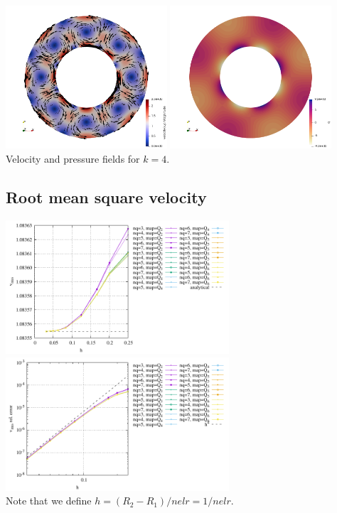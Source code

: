 \begin{center}
\includegraphics[width=6cm]{python_codes/fieldstone_152/images/vel}
\includegraphics[width=6cm]{python_codes/fieldstone_152/images/press}\\
{\captionfont Velocity and pressure fields for $k=4$.}
\end{center}

\subsection*{Root mean square velocity}

\begin{center}
\includegraphics[width=8.3cm]{python_codes/fieldstone_152/RESULTS/exp0/vrms}
\includegraphics[width=8.3cm]{python_codes/fieldstone_152/RESULTS/exp0/vrms_error}\\
{\captionfont Note that we define $h=(R_2-R_1)/nelr=1/nelr$.}
\end{center}

